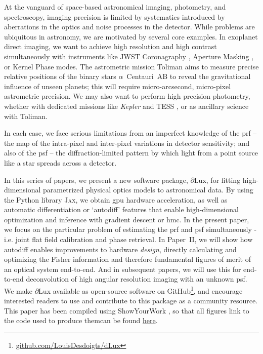 \documentclass[]{spieman}
\newcommand\dlux{$\partial$Lux\xspace}
\begin{document}
At the vanguard of space-based astronomical imaging, photometry, and spectroscopy, imaging precision is limited by systematics introduced by aberrations in the optics and noise processes in the detector. While problems are ubiquitous in astronomy, we are motivated by several core examples. In exoplanet direct imaging, we want to achieve high resolution and high contrast simultaneously with instruments like JWST Coronagraphy \cite{Girard2022}, Aperture Masking \cite{Sivaramakrishnan2022}, or Kernel Phase \cite{Martinache2010,Kammerer2022} modes. The astrometric mission Toliman \cite{tuthill2018} aims to measure precise relative positions of the binary stars $\alpha$~Centauri~AB to reveal the gravitational influence of unseen planets; this will require micro-arcsecond, micro-pixel astrometric precision. We may also want to perform high precision photometry, whether with dedicated missions like \textit{Kepler} \cite{Borucki2010} and TESS \cite{Ricker2015}, or as ancillary science with Toliman. 

In each case, we face serious limitations from an imperfect knowledge of the \ac{prf} -- the map of the intra-pixel and inter-pixel variations in detector sensitivity; and also of the \ac{psf} -- the diffraction-limited pattern by which light from a point source like a star spreads across a detector.

In this series of papers, we present a new software package, \dlux, for fitting high-dimensional parametrized physical optics models to astronomical data. By using the Python library \textsc{Jax}\cite{jax}, we obtain \ac{gpu} hardware acceleration, as well as automatic differentiation or `autodiff' \cite{Margossian2018} features that enable high-dimensional optimization and inference with gradient descent or \ac{hmc}. In the present paper, we focus on the particular problem of estimating the \ac{prf} and \ac{psf} simultaneously - i.e. joint flat field calibration and phase retrieval. In Paper~II, we will show how autodiff enables improvements to hardware \textit{design}, directly calculating and optimizing the Fisher information and therefore fundamental figures of merit of an optical system end-to-end. And in subsequent papers, we will use this for end-to-end deconvolution of high angular resolution imaging with an unknown \ac{psf}. We make \dlux available as open-source software on GitHub\footnote{\href{https://github.com/LouisDesdoigts/dLux}{github.com/LouisDesdoigts/dLux}}, and encourage interested readers to use and contribute to this package as a community resource. This paper has been compiled using ShowYourWork \cite{Luger2021}, so that all figures link to the code used to produce themcan be found \href{https://github.com/LouisDesdoigts/instrumental_calibration/tree/main}{here}.
\end{document}
